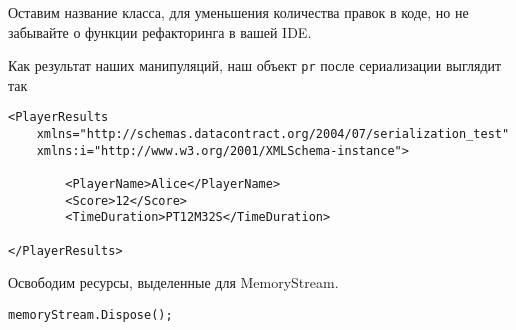 Оставим название класса, для уменьшения количества правок в коде, но не забывайте о функции рефакторинга в вашей IDE. 

Как результат наших манипуляций, наш объект \texttt{pr} после сериализации выглядит так

\begin{verbatim}
<PlayerResults 
	xmlns="http://schemas.datacontract.org/2004/07/serialization_test"
	xmlns:i="http://www.w3.org/2001/XMLSchema-instance">

		<PlayerName>Alice</PlayerName>
		<Score>12</Score>
		<TimeDuration>PT12M32S</TimeDuration>
		
</PlayerResults>
\end{verbatim}

Освободим ресурсы, выделенные для MemoryStream.
\begin{verbatim}
memoryStream.Dispose();
\end{verbatim}


